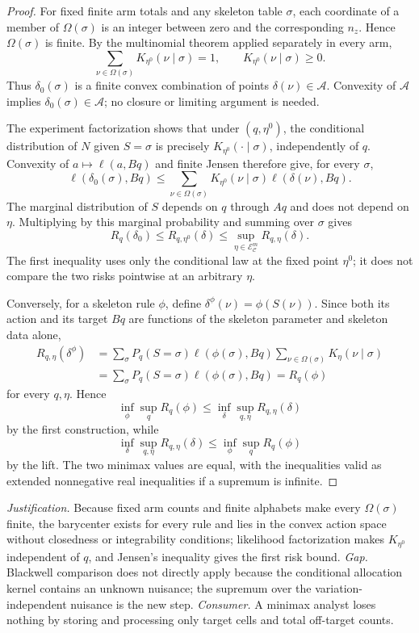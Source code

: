 \documentclass{article}
\begin{document}
\begin{proof}
For fixed finite arm totals and any skeleton table \(\sigma\), each coordinate of a member of \(\Omega(\sigma)\) is an integer between zero and the corresponding \(n_z\).  Hence \(\Omega(\sigma)\) is finite.  By the multinomial theorem applied separately in every arm,
\[
\sum_{\nu\in\Omega(\sigma)}K_{\eta^0}(\nu\mid\sigma)=1,
\qquad K_{\eta^0}(\nu\mid\sigma)\ge0.
\]
Thus \(\delta_0(\sigma)\) is a finite convex combination of points \(\delta(\nu)\in\mathcal A\).  Convexity of \(\mathcal A\) implies \(\delta_0(\sigma)\in\mathcal A\); no closure or limiting argument is needed.

The experiment factorization shows that under \((q,\eta^0)\), the conditional distribution of \(N\) given \(S=\sigma\) is precisely \(K_{\eta^0}(\cdot\mid\sigma)\), independently of \(q\).  Convexity of \(a\mapsto\ell(a,Bq)\) and finite Jensen therefore give, for every \(\sigma\),
\[
\ell(\delta_0(\sigma),Bq)
\le
\sum_{\nu\in\Omega(\sigma)}K_{\eta^0}(\nu\mid\sigma)
\ell(\delta(\nu),Bq).
\]
The marginal distribution of \(S\) depends on \(q\) through \(Aq\) and does not depend on \(\eta\).  Multiplying by this marginal probability and summing over \(\sigma\) gives
\[
R_q(\delta_0)
\le R_{q,\eta^0}(\delta)
\le\sup_{\eta\in\mathcal E_{\mathcal C}^m}R_{q,\eta}(\delta).
\]
The first inequality uses only the conditional law at the fixed point \(\eta^0\); it does not compare the two risks pointwise at an arbitrary \(\eta\).

Conversely, for a skeleton rule \(\phi\), define \(\delta^\phi(\nu)=\phi(S(\nu))\).  Since both its action and its target \(Bq\) are functions of the skeleton parameter and skeleton data alone,
\[
\begin{aligned}
R_{q,\eta}(\delta^\phi)
 &=\sum_{\sigma}P_q(S=\sigma)\ell(\phi(\sigma),Bq)
   \sum_{\nu\in\Omega(\sigma)}K_\eta(\nu\mid\sigma)\\
 &=\sum_{\sigma}P_q(S=\sigma)\ell(\phi(\sigma),Bq)
 =R_q(\phi)
\end{aligned}
\]
for every \(q,\eta\).  Hence
\[
\inf_\phi\sup_qR_q(\phi)
\le\inf_\delta\sup_{q,\eta}R_{q,\eta}(\delta)
\]
by the first construction, while
\[
\inf_\delta\sup_{q,\eta}R_{q,\eta}(\delta)
\le\inf_\phi\sup_qR_q(\phi)
\]
by the lift.  The two minimax values are equal, with the inequalities valid as extended nonnegative real inequalities if a supremum is infinite.
\end{proof}
\par\smallskip\noindent \textit{Justification.} Because fixed arm counts and finite alphabets make every \(\Omega(\sigma)\) finite, the barycenter exists for every rule and lies in the convex action space without closedness or integrability conditions; likelihood factorization makes \(K_{\eta^0}\) independent of \(q\), and Jensen's inequality gives the first risk bound. \textit{Gap.} Blackwell comparison does not directly apply because the conditional allocation kernel contains an unknown nuisance; the supremum over the variation-independent nuisance is the new step. \textit{Consumer.} A minimax analyst loses nothing by storing and processing only target cells and total off-target counts.
\end{document}
